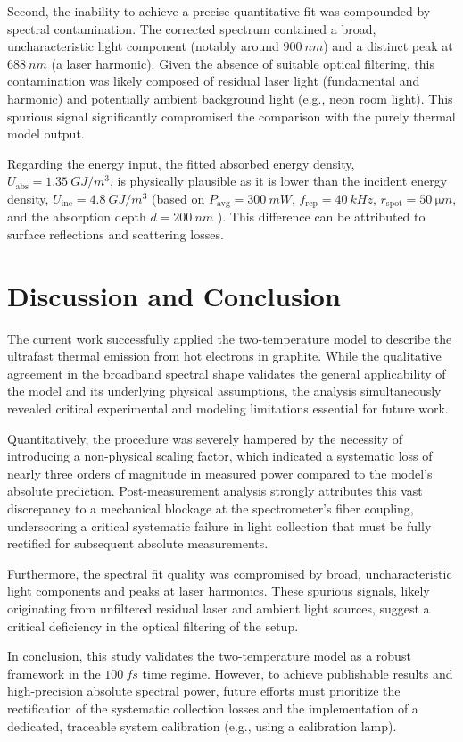 \documentclass[
	a4paper,
]{scrarticle}
\begin{document}
Second, the inability to achieve a precise quantitative fit was compounded by spectral contamination. The corrected spectrum contained a broad, uncharacteristic light component (notably around $\SI{900}{nm}$) and a distinct peak at $\SI{688}{nm}$ (a laser harmonic). Given the absence of suitable optical filtering, this contamination was likely composed of residual laser light (fundamental and harmonic) and potentially ambient background light (e.g., neon room light). This spurious signal significantly compromised the comparison with the purely thermal model output.

Regarding the energy input, the fitted absorbed energy density, $U_{\text{abs}} = \SI{1.35}{GJ/m^3}$, is physically plausible as it is lower than the incident energy density, $U_{\text{inc}} = \SI{4.8}{GJ/m^3}$ (based on $P_{\text{avg}}=\SI{300}{mW}$, $f_{\text{rep}}=\SI{40}{kHz}$, $r_{\text{spot}}=\SI{50}{\micro m}$, and the absorption depth $d=\SI{200}{nm}$ \cite{smauszDeterminationUVVisible2017}). This difference can be attributed to surface reflections and scattering losses.


\clearpage
\section{Discussion and Conclusion}
The current work successfully applied the two-temperature model to describe the ultrafast thermal emission from hot electrons in graphite. While the qualitative agreement in the broadband spectral shape validates the general applicability of the model and its underlying physical assumptions, the analysis simultaneously revealed critical experimental and modeling limitations essential for future work.

Quantitatively, the procedure was severely hampered by the necessity of introducing a non-physical scaling factor, which indicated a systematic loss of nearly three orders of magnitude in measured power compared to the model's absolute prediction. Post-measurement analysis strongly attributes this vast discrepancy to a mechanical blockage at the spectrometer's fiber coupling, underscoring a critical systematic failure in light collection that must be fully rectified for subsequent absolute measurements.

Furthermore, the spectral fit quality was compromised by broad, uncharacteristic light components and peaks at laser harmonics. These spurious signals, likely originating from unfiltered residual laser and ambient light sources, suggest a critical deficiency in the optical filtering of the setup.

In conclusion, this study validates the two-temperature model as a robust framework in the $\SI{100}{fs}$ time regime. However, to achieve publishable results and high-precision absolute spectral power, future efforts must prioritize the rectification of the systematic collection losses and the implementation of a dedicated, traceable system calibration (e.g., using a calibration lamp).

\clearpage
\printbibliography
\end{document}
